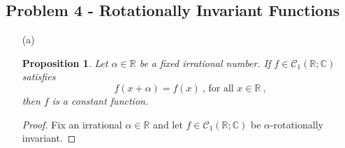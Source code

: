 \documentclass[12pt, reqno]{article}
\newtheorem{prop}{Proposition}[section]
\theoremstyle{definition}
\theoremstyle{remark}
\begin{document}
\subsection*{Problem 4 - Rotationally Invariant Functions}
\begin{itemize}
\item[(a)] 


\begin{prop}
    Let $\alpha\in\mathbb{R}$ be a fixed irrational number. If $f\in\mathcal{C}_1(\mathbb{R;C})$ satisfies
    \begin{equation} \label{eq_rotinv}
        f(x + \alpha) = f(x) ~\mbox{, for all } x \in \mathbb{R} ~\mbox{,}
    \end{equation}then $f$ is a constant function.
\end{prop}

\begin{proof}
    Fix an irrational $\alpha\in \mathbb{R}$ and let $f\in\mathcal{C}_{1}(\mathbb{R};\mathbb{C})$ be $\alpha$-rotationally invariant. 


\end{proof}
\end{itemize}
\end{document}
